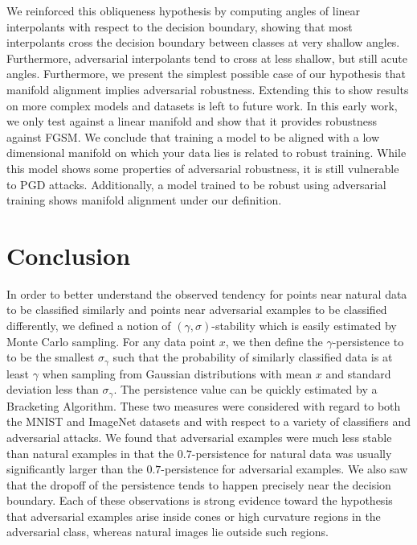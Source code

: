We reinforced this obliqueness hypothesis by computing angles of linear interpolants with respect to the decision boundary, showing that most interpolants cross the decision boundary between classes at very shallow angles. Furthermore, adversarial interpolants tend to cross at less shallow, but still acute angles. Furthermore, we present the simplest possible case of our hypothesis that manifold alignment implies adversarial robustness.
Extending this to show results on more complex models and datasets is left to future work.
In this early work, we only test against a linear manifold and show that it provides robustness against FGSM.
We conclude that training a model to be aligned with a low dimensional manifold on which your data lies is related to robust training.
While this model shows some properties of adversarial robustness, it is still vulnerable to PGD attacks.
Additionally, a model trained to be robust using adversarial training shows manifold alignment under our definition.

\nocite{langley00}


\section{Conclusion}

In order to better understand the observed tendency for points near natural data to be classified similarly and points near
adversarial examples to be classified differently, we defined a notion of $(\gamma,\sigma)$-stability which is easily estimated by Monte Carlo sampling. For any data point $x$, we then define the $\gamma$-persistence to to be the smallest $\sigma_\gamma$ such that the probability of similarly classified data is at least $\gamma$ when sampling from Gaussian distributions with mean $x$ and standard deviation less than $\sigma_\gamma$. The persistence value can be quickly estimated by a Bracketing Algorithm. These two measures were considered with regard to both the MNIST and ImageNet datasets and with respect to a variety of classifiers and adversarial attacks. We found that adversarial examples were much less stable than natural examples in that the $0.7$-persistence for natural data was usually significantly larger than the $0.7$-persistence for adversarial examples. We also saw that the dropoff of the persistence tends to happen precisely near the decision boundary. Each of these observations is strong evidence toward the hypothesis that adversarial examples arise inside cones or high curvature regions in the adversarial class, whereas natural images lie outside such regions.

